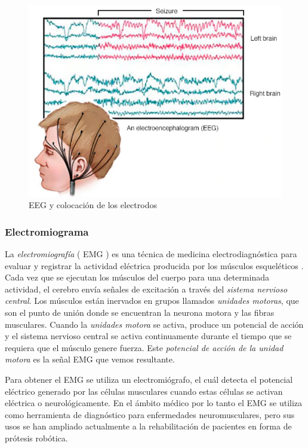 \begin{figure}[H]
	\center
	\includegraphics[scale=0.7]{imagenes/EstadodelArte/EEG.png}
	\caption{EEG y colocación de los electrodos}
	\label{fig:EEG}
\end{figure}
 

\subsubsection{Electromiograma}

La \textit{electromiografía} ( EMG ) es una técnica de medicina electrodiagnóstica para evaluar y registrar la actividad eléctrica producida por los músculos esqueléticos . Cada vez que se ejecutan los músculos del cuerpo para una determinada actividad, el cerebro envía señales de excitación a través del \textit{sistema nervioso central}. Los músculos están inervados en grupos llamados \textit{unidades motoras}, que son el punto de unión donde se encuentran la neurona motora y las fibras musculares.  Cuando la \textit{unidades motora} se activa, produce un potencial de acción y el sistema nervioso central se activa continuamente durante el tiempo que se requiera que el músculo genere fuerza. Este \textit{potencial de acción de la unidad motora} es la señal EMG que vemos resultante.

Para obtener el EMG se utiliza un electromiógrafo, el cuál detecta el potencial eléctrico generado por las células musculares cuando estas células se activan eléctrica o neurológicamente. En el ámbito médico por lo tanto el EMG se utiliza como herramienta de diagnóstico para enfermedades neuromusculares, pero sus usos se han ampliado actualmente a la rehabilitación de pacientes en forma de prótesis robótica. \newline

